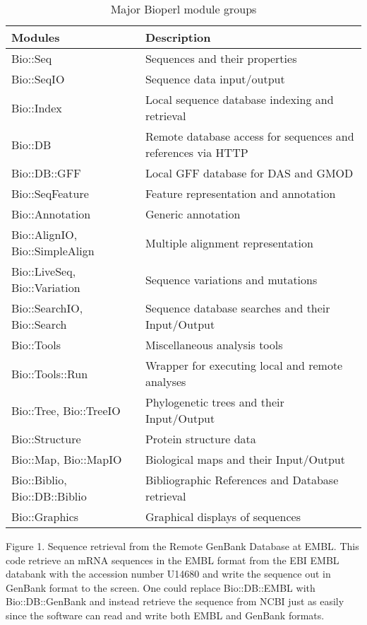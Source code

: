 \documentclass[12pt]{article}
\begin{document}
\begin{table}[h]
\begin{tabular}{|l|l|}
\hline
\textbf{Modules} & \textbf{Description} \\
\hline
Bio::Seq &  Sequences and their properties \\
Bio::SeqIO & Sequence data input/output \\
Bio::Index & Local sequence database indexing and retrieval \\ 
Bio::DB & Remote database access for sequences and references via HTTP \\
Bio::DB::GFF & Local GFF database for DAS and GMOD \\
Bio::SeqFeature & Feature representation and annotation \\
Bio::Annotation & Generic annotation \\
Bio::AlignIO, Bio::SimpleAlign & Multiple alignment representation \\
Bio::LiveSeq, Bio::Variation & Sequence variations and mutations \\
Bio::SearchIO, Bio::Search  & Sequence database searches and their Input/Output \\
Bio::Tools &  Miscellaneous analysis tools \\
Bio::Tools::Run &  Wrapper for executing local and remote analyses \\
Bio::Tree, Bio::TreeIO & Phylogenetic trees and their Input/Output  \\
Bio::Structure & Protein structure data \\
Bio::Map, Bio::MapIO & Biological maps and their Input/Output \\
Bio::Biblio, Bio::DB::Biblio & Bibliographic References and Database
retrieval \\ 
Bio::Graphics & Graphical displays of sequences \\
\hline
\end{tabular}
\caption{Major Bioperl module groups}
\label{modules}
\end{table}

\newpage


Figure 1. Sequence retrieval from the Remote GenBank Database at EMBL.
This code retrieve an mRNA sequences in the EMBL format from the EBI
EMBL databank with the accession number U14680 and write the sequence
out in GenBank format to the screen.  One could replace Bio::DB::EMBL
with Bio::DB::GenBank and instead retrieve the sequence from NCBI just
as easily since the software can read and write both EMBL and GenBank
formats.
\end{document}
